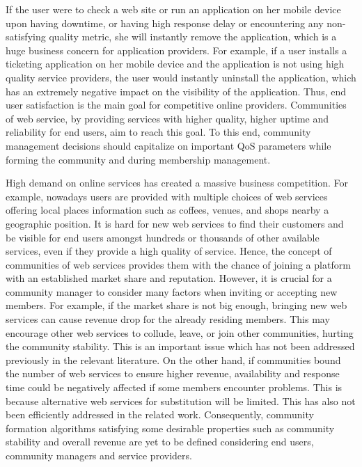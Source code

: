 If the user were to check a web site or run an application on her
mobile device upon having downtime, or having high response delay
or encountering any non-satisfying quality metric, she will
instantly remove the application, which is a huge business concern
for application providers. For example, if a user installs a
ticketing application on her mobile device and the application is
not using high quality service providers, the user would instantly
uninstall the application, which has an extremely negative impact
on the
visibility of the application. %
Thus, end user satisfaction is the main goal for competitive
online providers. Communities of web service, by providing
services with higher quality, higher uptime and reliability for
end users, aim to reach this goal. To this end, community
management decisions should capitalize on important QoS parameters
while forming the community and during membership management.


High demand on online services has created a massive business
competition. For example, nowadays users are provided with
multiple choices of web services offering local places information
such as coffees, venues, and shops nearby a geographic position.
It is hard for new web services to find their customers and be
visible for end users amongst hundreds or thousands of other
available services, even if they provide a high quality of
service. Hence, the concept of communities of web services
provides them with the chance of joining a platform with an
established market share and reputation. However, it is crucial
for a community manager to consider many factors when inviting or
accepting new members. For example, if the market share is not big
enough, bringing new web services can cause revenue drop for the
already residing members. This may encourage other web services to
collude, leave, or join other communities, hurting the community
stability. This is an important issue which has not been addressed
previously in the relevant literature. On the other hand, if
communities bound the number of web services to ensure higher
revenue, availability and response time could be negatively
affected if some members encounter problems. This is because
alternative web services for substitution will be limited.  This
has also not been efficiently addressed in the related work.
Consequently, community formation algorithms satisfying some
desirable properties such as community stability and overall
revenue are yet to be defined considering end users, community
managers and service providers.


